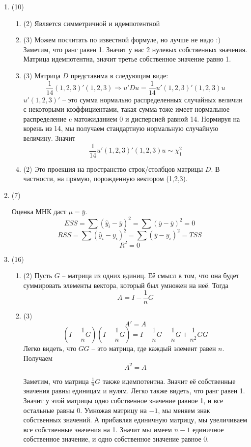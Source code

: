 \documentclass[12pt, a4paper]{article}\usepackage[]{graphicx}\usepackage[]{color}
\begin{document}
\begin{enumerate}
\item (10)
\begin{enumerate}
  \item (2)
  Является симметричной и идемпотентной
  \item (3)
Можем посчитать по известной формуле, но лучше не надо :) Заметим, что ранг равен 1. Значит у нас 2 нулевых собственных значения. Матрица идемпотентна, значит третье собственное значение равно 1.
  \item (3)
Матрица $D$ представима в следующим виде:
\[
\frac{1}{14} (1, 2, 3)' (1,2,3) \Rightarrow u'Du = \frac{1}{14} u'(1, 2, 3)' (1,2,3)u
\]
$u'(1, 2,3)' $ -- это сумма нормально распределенных случайных величин с некоторыми коэффициентами, такая сумма тоже имеет нормальное распределение c матожиданием 0 и дисперсией равной 14. Нормируя на корень из 14, мы получаем стандартную нормальную случайную величину. Значит
\[
\frac{1}{14} u'(1, 2, 3)' (1,2,3)u \sim \chi_1^2
\]

  \item (2)
Это проекция на пространство строк/столбцов матрицы $D$. В частности, на прямую, порожденную вектором (1,2,3).
\end{enumerate}

\item (7)

Оценка МНК даст $\mu = \overline{y}$.
\[
ESS = \sum (\hat{y}_i - \overline{y})^2 = \sum (\overline{y}- \overline{y})^2 = 0
\]
\[
RSS =  \sum (\hat{y}_i - y_i)^2 =  \sum (\overline{y} - y_i)^2  = TSS
\]
\[
R^2 = 0
\]

\item (16)
\begin{enumerate}
\item (2)
Пусть $G$ -- матрица из одних единиц. Её смысл в том, что она будет суммировать элементы вектора, который был умножен на неё. Тогда
\[
A = I - \frac{1}{n}G
\]
\item (3)
\[
A' = A
\]
\[
(I - \frac{1}{n}G)(I - \frac{1}{n}G) = I -  \frac{1}{n}G - \frac{1}{n}G + \frac{1}{n^2}GG
\]
Легко видеть, что $GG$ -- это матрица, где каждый элемент равен $n$. Получаем
\[
A^2 = A
\]

Заметим, что матрица $\frac{1}{n}G$ также идемпотентна. Значит её собственные значения равны единицам и нулям. Легко также видеть, что ранг равен 1. Значит у этой матрицы одно собственное значение равное 1, и все остальные равны 0. Умножая матрицу на $-1$, мы меняем знак собственных значений. А прибавляя единичную матрицу, мы увеличиваем все собственные значения на 1. Значит мы имеем $n-1$ единичное собственное значение, и одно собственное значение равное 0.


\end{enumerate}
\end{enumerate}
\end{document}
